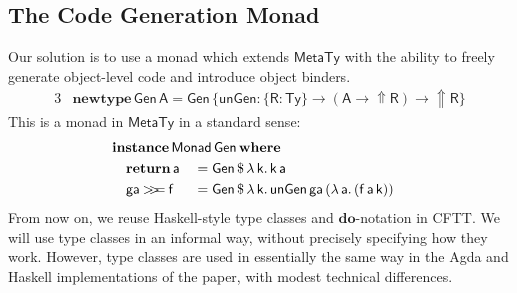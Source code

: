 \documentclass[acmsmall,screen,review,anonymous]{acmart}
\newcommand{\mit}[1]{{\mathsf{#1}}}
\newcommand{\msf}[1]{{\mathsf{#1}}}
\newcommand{\mbf}[1]{{\mathbf{#1}}}
\newcommand{\ind}{\hspace{1em}}
\newcommand{\return}{\mbf{return}\,}
\newcommand{\lam}{\lambda\,}
\newcommand{\where}{\mbf{where}}
\newcommand{\vk}{\mathsf{k}}
\newcommand{\vA}{\mathsf{A}}
\newcommand{\vR}{\mathsf{R}}
\newcommand{\va}{\mathsf{a}}
\newcommand{\vf}{\mathsf{f}}
\newcommand{\Monad}{\msf{Monad}}
\newcommand{\Up}{{\Uparrow}}
\newcommand{\bind}{\mathbin{>\!\!>\mkern-6.7mu=}}
\newcommand{\MTy}{\msf{MetaTy}}
\newcommand{\Ty}{\msf{Ty}}
\theoremstyle{remark}
\newcommand{\instance}{\mbf{instance}\,}
\newcommand{\Gen}{\msf{Gen}}
\newcommand{\unGen}{\mit{unGen}}
\newcommand{\newtype}{\mbf{newtype}\,}
\newcommand{\dlr}{\,\$\,}
\begin{document}
\subsection{The Code Generation Monad}\label{sec:the-code-generation-monad}

Our solution is to use a monad which extends $\MTy$ with the ability to
freely generate object-level code and introduce object binders.
\begin{alignat*}{3}
  & \newtype \Gen\,\vA = \Gen\,\{\unGen : \{\vR : \Ty\} \to (\vA \to \Up \vR) \to \Up \vR\}
\end{alignat*}
This is a monad in $\MTy$ in a standard sense:
\begin{alignat*}{3}
  &\mathrlap{\instance \Monad\,\Gen\,\where}\\
  &\ind \return \va        &&= \Gen \dlr \lam \vk.\,\vk\,\va\\
  &\ind \mit{ga} \bind \vf &&= \Gen \dlr \lam \vk.\,\unGen\,\mit{ga}\,(\lam \va.\,(\vf\,\va\,\vk))
\end{alignat*}
From now on, we reuse Haskell-style type classes and $\mbf{do}$-notation in
CFTT. We will use type classes in an informal way, without precisely specifying
how they work. However, type classes are used in essentially the same way in the
Agda and Haskell implementations of the paper, with modest technical
differences.
\end{document}
